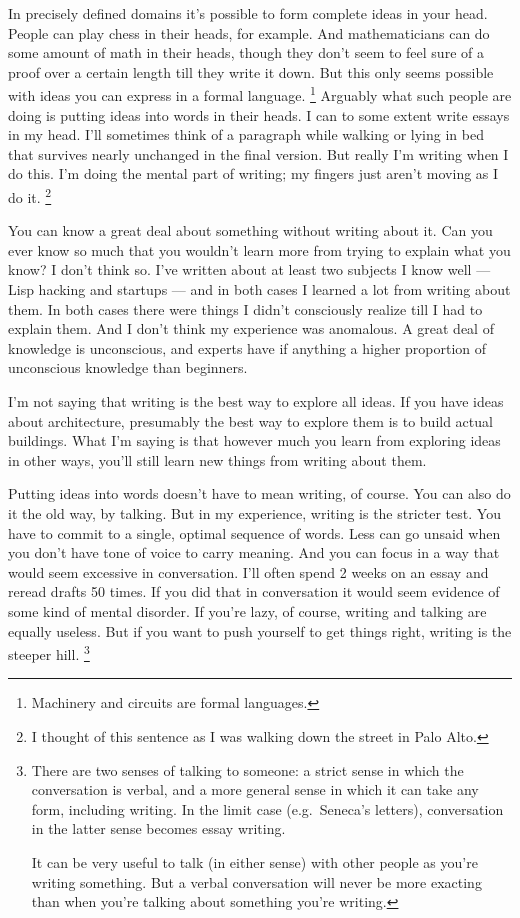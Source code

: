 In precisely defined domains it's possible to form complete ideas in
your head. People can play chess in their heads, for example. And
mathematicians can do some amount of math in their heads, though they
don't seem to feel sure of a proof over a certain length till they write
it down. But this only seems possible with ideas you can express in a
formal language. \footnote{Machinery and circuits are formal languages.} Arguably what such people are
doing is putting ideas into words in their heads. I can to some extent
write essays in my head. I'll sometimes think of a paragraph while
walking or lying in bed that survives nearly unchanged in the final
version. But really I'm writing when I do this. I'm doing the mental
part of writing; my fingers just aren't moving as I do it.
\footnote{I thought of this sentence as I was walking down the street in
Palo Alto.}

You can know a great deal about something without writing about it. Can
you ever know so much that you wouldn't learn more from trying to
explain what you know? I don't think so. I've written about at least two
subjects I know well --- Lisp hacking and startups --- and in both cases
I learned a lot from writing about them. In both cases there were things
I didn't consciously realize till I had to explain them. And I don't
think my experience was anomalous. A great deal of knowledge is
unconscious, and experts have if anything a higher proportion of
unconscious knowledge than beginners.

I'm not saying that writing is the best way to explore all ideas. If you
have ideas about architecture, presumably the best way to explore them
is to build actual buildings. What I'm saying is that however much you
learn from exploring ideas in other ways, you'll still learn new things
from writing about them.

Putting ideas into words doesn't have to mean writing, of course. You
can also do it the old way, by talking. But in my experience, writing is
the stricter test. You have to commit to a single, optimal sequence of
words. Less can go unsaid when you don't have tone of voice to carry
meaning. And you can focus in a way that would seem excessive in
conversation. I'll often spend 2 weeks on an essay and reread drafts 50
times. If you did that in conversation it would seem evidence of some
kind of mental disorder. If you're lazy, of course, writing and talking
are equally useless. But if you want to push yourself to get things
right, writing is the steeper hill. \footnote{There are two senses of talking to someone: a strict sense in
which the conversation is verbal, and a more general sense in which it
can take any form, including writing. In the limit case (e.g.~Seneca's
letters), conversation in the latter sense becomes essay writing.

It can be very useful to talk (in either sense) with other people as
you're writing something. But a verbal conversation will never be more
exacting than when you're talking about something you're writing.}

